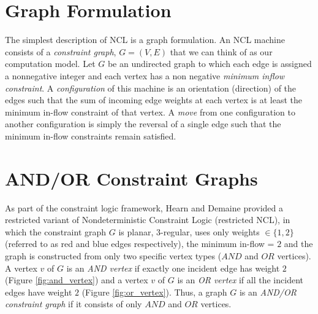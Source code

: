 \section{Graph Formulation}\label{sec:formalism}
The simplest description of NCL is a graph formulation. An NCL machine consists of a \textit{constraint graph}, $G = (V,E)$ that we can think of as
our computation model. Let $G$ be an undirected graph to which each edge is assigned a nonnegative integer and each vertex has a
non negative \textit{minimum inflow constraint}. A \textit{configuration} of this machine is an orientation (direction) of the edges such that the sum
of incoming edge weights at each vertex is at least the minimum in-ﬂow constraint of that vertex. A \textit{move} from one
configuration to another configuration is simply the reversal of a single edge such that the minimum in-ﬂow constraints remain satisfied.


\section{AND/OR Constraint Graphs} \label{sec:contraint_graph}
As part of the constraint logic framework,  Hearn and Demaine provided a restricted variant of Nondeterministic Constraint Logic (restricted NCL),
in which the constraint graph $G$ is planar, $3$-regular, uses only weights $ \in \{1,2\}$ (referred to as red and blue edges respectively), the minimum
in-flow = $2$ and the graph is constructed from only two specific vertex types ($AND$ and $OR$ vertices). A vertex $v$ of $G$ is an \textit{AND vertex}
if exactly one incident edge has weight $2$ (Figure \ref{fig:and_vertex}) and a vertex $v$ of $G$ is an \textit{OR vertex} if all the incident edges
have weight $2$ (Figure \ref{fig:or_vertex}). Thus, a graph $G$ is an \textit{AND/OR constraint graph} if it consists of only $AND$ and $OR$ vertices.

